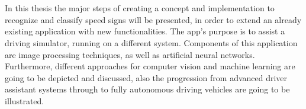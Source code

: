 \chapter{\abstractname}
In this thesis the major steps of creating a concept and implementation to recognize and classify speed signs will be presented, in order to extend an already existing application with new functionalities. The app's purpose is to assist a driving simulator, running on a different system. Components of this application are image processing techniques, as well as artificial neural networks. Furthermore, different approaches for computer vision and machine learning are going to be depicted and discussed, also the progression from advanced driver assistant systems through to fully autonomous driving vehicles are going to be illustrated.
\newline